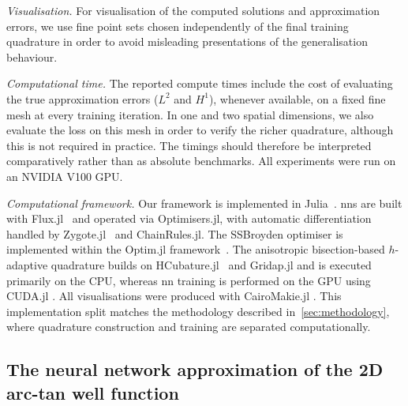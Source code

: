 \documentclass[oneside,reqno,11pt,a4paper]{amsart}
\theoremstyle{definition}
\begin{document}
\medskip
\noindent
\emph{Visualisation.} 
For visualisation of the computed solutions and approximation errors, we use
fine point sets chosen independently of the final training quadrature in order
to avoid misleading presentations of the generalisation behaviour.

\medskip
\noindent
\emph{Computational time.} 
The reported compute times include the cost of evaluating the true
approximation errors ($L^2$ and $H^1$), whenever available, on a fixed fine
mesh at every training iteration. In one and two spatial dimensions, we also
evaluate the loss on this mesh in order to verify the richer quadrature,
although this is not required in practice. The timings should therefore be
interpreted comparatively rather than as absolute benchmarks. All experiments
were run on an NVIDIA V100 GPU.

\medskip
\noindent\emph{Computational framework.}
Our framework is implemented in Julia~\cite{Julia2017}. \acp{nn} are
built with Flux.jl~\cite{FluxOSS2018} and operated via Optimisers.jl, with
automatic differentiation handled by Zygote.jl~\cite{Zygote2019} and
ChainRules.jl. The SSBroyden optimiser is implemented within the Optim.jl
framework~\cite{Optimjl2018}. The anisotropic bisection-based
$h$-adaptive quadrature builds on HCubature.jl~\cite{HCubature} and Gridap.jl
\cite{GridapBadia2020,GridapVerdugo2022} and is executed primarily on the CPU,
whereas \ac{nn} training is performed on the GPU using CUDA.jl
\cite{besard2018juliagpu}. All visualisations were produced with CairoMakie.jl
\cite{DanischKrumbiegel2021}. This implementation split matches the
methodology described in~\cref{sec:methodology}, where quadrature construction
and training are separated computationally.

\subsection{The neural network approximation of the 2D arc-tan well function}
\label{subsec:fa-2d-problem}
\end{document}
